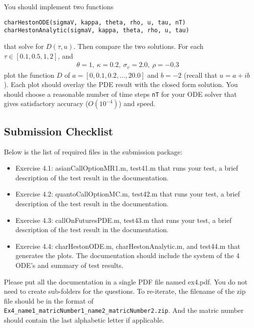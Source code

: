 \documentclass[10pt,a4paper,hidelinks,fleqn]{article}            %
\begin{document}
You should implement two functions
\begin{verbatim}
charHestonODE(sigmaV, kappa, theta, rho, u, tau, nT)
charHestonAnalytic(sigmaV, kappa, theta, rho, u, tau)
\end{verbatim}
that solve for $D(\tau, u)$. 
Then compare the two solutions. For each $\tau \in [0.1, 0.5, 1, 2]$, and
\begin{align*}
~\theta = 1, ~\kappa = 0.2, ~\sigma_v = 2.0, ~\rho = -0.3
\end{align*}
plot the function $D$ of $a = [0, 0.1, 0.2, ..., 20.0]$ and $b = -2$ (recall that $u = a+ib$). 
Each plot should overlay the PDE result with the closed form solution.
You should choose a reasonable number of time steps \verb=nT= for your ODE solver that gives satisfactory accuracy ($O(10^{-4})$) and speed.


\subsection*{Submission Checklist}
Below is the list of required files in the submission package:
\begin{itemize}
\item Exercise 4.1: asianCallOptionMR1.m, test41.m that runs your test, a brief description of the test result in the documentation.
\item Exercise 4.2: quantoCallOptionMC.m, test42.m that runs your test, a brief description of the test result in the documentation.
\item Exercise 4.3: callOnFuturesPDE.m, test43.m that runs your test, a brief description of the test result in the documentation.
\item Exercise 4.4: charHestonODE.m, charHestonAnalytic.m, and test44.m that generates the plots. The documentation should include the system of the 4 ODE's and summary of test results.
\end{itemize}
Please put all the documentation in a single PDF file named ex4.pdf.
You do not need to create sub-folders for the questions. 
To re-iterate, the filename of the zip file should be in the format of \verb=Ex4_name1_matricNumber1_name2_matricNumber2.zip=.
And the matric number should contain the last alphabetic letter if applicable. 




\end{document}
